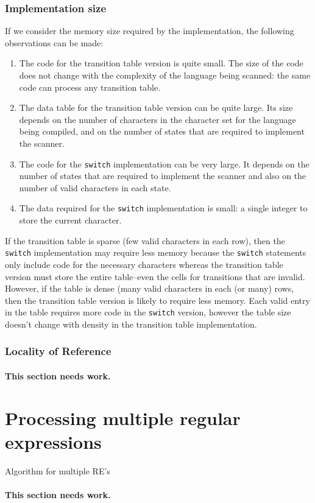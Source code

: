 \documentclass[letterpaper,12pt,openany,reqno]{book}%
\newcommand{\code}[1] {\lstinline[breaklines=yes,breakatwhitespace=yes]{#1}}
\newcommand{\needswork}{\paragraph{This section needs work.}}
\begin{document}
\subsubsection{Implementation size}\label{S.scannersize}
If we consider the memory size required by the implementation, the following observations can be made:
\begin{enumerate}
\item The code for the transition table version is quite small. The size of the code does not change with the complexity of the language being scanned: the same code can process any transition table.
\item The data table for the transition table version can be quite large. Its size depends on the number of characters in the character set for the language being compiled, and on the number of states that are required to implement the scanner.
\item The code for the \code{switch} implementation can be very large. It depends on the number of states that are required to implement the scanner and also on the number of valid characters in each state.
\item The data required for the \code{switch} implementation is small: a single integer to store the current character.
\end{enumerate}

If the transition table is sparse (few valid characters in each row), then the \code{switch} implementation may require less memory because the \code{switch} statements only include code for the necessary characters whereas the transition table version must store the entire table--even the cells for transitions that are invalid. However, if the table is dense (many valid characters in each (or many) rows, then the transition table version is likely to require less memory. Each valid entry in the table requires more code in the \code{switch} version, however the table size doesn't change with density in the transition table implementation.

\subsubsection{Locality of Reference}\label{S.scannerlocality}

\needswork{}


\section{Processing multiple regular expressions}\label{S.MultiScanner}
Algorithm for multiple RE's
\needswork{}
\end{document}
